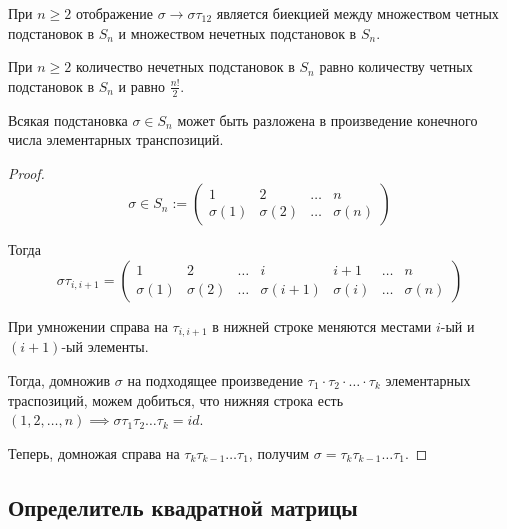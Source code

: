 \begin{corollary}
    При $n \geq 2$ отображение $\sigma \rightarrow \sigma \tau_{12}$ является биекцией между множеством четных подстановок в $S_n$ и множеством нечетных подстановок в $S_n$.
\end{corollary}

\begin{corollary}
    При $n \geq 2$ количество нечетных подстановок в $S_n$ равно количеству четных подстановок в $S_n$ и равно $\frac{n!}{2}$.
\end{corollary}

\begin{theorem}
    Всякая подстановка $\sigma \in S_n$ может быть разложена в произведение конечного числа элементарных транспозиций.
\end{theorem}

\begin{proof}
    \begin{equation*}
        \sigma \in S_n :=
        \begin{pmatrix}
            1 & 2 & \dots & n \\
            \sigma (1) & \sigma (2) & \dots & \sigma (n)
        \end{pmatrix}
    \end{equation*}

    Тогда
    \begin{equation*}
        \sigma \tau_{i, i+1} = \begin{pmatrix}
            1 & 2 & \dots & i & i+1 & \dots & n \\
            \sigma (1) & \sigma (2) & \dots & \sigma(i+1) & \sigma(i) & \dots & \sigma (n)
        \end{pmatrix}
    \end{equation*}

    При умножении справа на $\tau_{i, i+1}$ в нижней строке меняются местами $i$-ый и $(i+1)$-ый элементы.

    Тогда, домножив $\sigma$ на подходящее произведение $\tau_1 \cdot \tau_2 \cdot \dots \cdot \tau_k$ элементарных траспозиций, можем добиться, что нижняя строка есть $(1, 2, \dots, n) \implies \sigma \tau_1 \tau_2 \dots \tau_k = id$.

    Теперь, домножая справа на $\tau_k \tau_{k-1} \dots \tau_1$, получим $\sigma = \tau_k \tau_{k-1} \dots \tau_1$.
\end{proof}

\subsection{Определитель квадратной матрицы}

